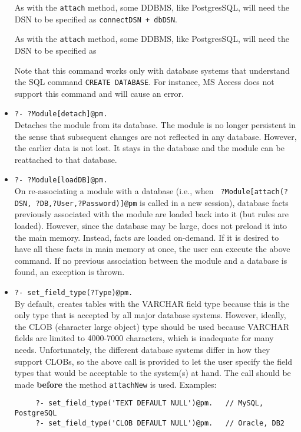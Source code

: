 \begin{itemize}
  As with the \texttt{attach} method, some DDBMS, like PostgresSQL, will
  need the DSN to be specified as \texttt{connectDSN + dbDSN}.
  
  As with the \texttt{attach} method, some DDBMS, like PostgresSQL, will
  need the DSN to be specified as 
  
  Note that this command works only with database systems that understand
  the SQL command {\tt CREATE DATABASE}. For instance, MS Access does not
  support this command and will cause an error.
\item {\tt ?- ?Module[detach]@pm.}\\
  Detaches the module from its database. The module is no longer persistent
  in the sense that subsequent changes are not reflected in any database.
  However, the earlier data is not lost. It stays in the database and the
  module can be reattached to that database.
\item {\tt ?- ?Module[loadDB]@pm.}\\
  On re-associating a module with a database (i.e., when {\tt
    ?Module[attach(?DSN, ?DB,?User,?Password)]@pm} is called in a new
  \FLSYSTEM session), database facts previously associated with the module are
  loaded back into it (but rules are loaded).  However, since the database may be large, \FLSYSTEM
  does not preload it into the main memory. Instead, facts are loaded
  on-demand.  If it is desired to have all these facts in main
  memory at once, the user can execute the above command. If no previous
  association between the module and a database is found, an exception is
  thrown.
\item \texttt{?- set\_field\_type(?Type)@pm.} \\  
  By default, \FLSYSTEM creates tables with the VARCHAR field type because
  this is the only type that is accepted by all major database systems.
  However, ideally, the CLOB (character large object) type should be used
  because VARCHAR fields are limited to 4000-7000 characters, which is
  inadequate for many needs.
  Unfortunately, the different database systems differ in how they support
  CLOBs, so the above call is provided to let the user specify the field types
  that would be acceptable to the system(s) at hand. The call should be
  made \textbf{before} the method \texttt{attachNew} is used. Examples:
\begin{verbatim}
     ?- set_field_type('TEXT DEFAULT NULL')@pm.   // MySQL, PostgreSQL
     ?- set_field_type('CLOB DEFAULT NULL')@pm.   // Oracle, DB2
\end{verbatim}
\end{itemize}



